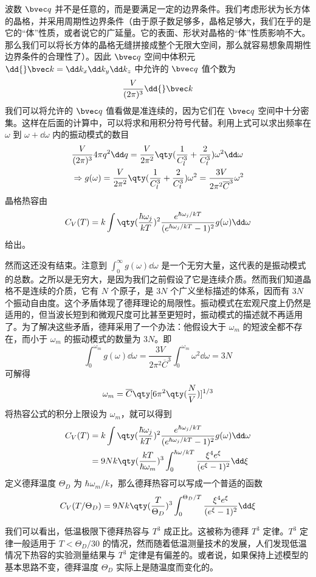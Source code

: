 波数 $\bvec q$ 并不是任意的，而是要满足一定的边界条件。我们考虑形状为长方体的晶格，并采用周期性边界条件（由于原子数足够多，晶格足够大，我们在乎的是它的“体”性质，或者说它的广延量。它的表面、形状对晶格的“体”性质影响不大。那么我们可以将长方体的晶格无缝拼接成整个无限大空间，那么就容易想象周期性边界条件的合理性了）。因此 $\bvec q$ 空间中体积元 $\dd{} \bvec k=\dd k_x\dd k_y\dd k_z$ 中允许的 $\bvec q$ 值个数为
\begin{equation}
\frac{V}{(2\pi)^3} \dd{} \bvec k
\end{equation}
我们可以将允许的 $\bvec q$ 值看做是准连续的，因为它们在 $\bvec q$ 空间中十分密集。这样在后面的计算中，可以将求和用积分符号代替。利用上式可以求出频率在 $\omega$ 到 $\omega+\dd \omega$ 内的振动模式的数目
\begin{equation}
\begin{aligned}
&\frac{V}{(2\pi)^3}4\pi q^2\dd q=\frac{V}{2\pi^2}\qty(\frac{1}{C_l^3}+\frac{2}{C_t^3})\omega^2\dd \omega\\
&\Rightarrow g(\omega)= \frac{V}{2\pi^2}\qty(\frac{1}{C_l^3}+\frac{2}{C_t^3}) \omega^2=\frac{3V}{2\pi^2 \overline C ^3} \omega^2
\end{aligned}
\end{equation}
晶格热容由
\begin{equation}
C_V(T)=k \int \qty(\frac{\hbar\omega_j}{kT})^2\frac{e^{\hbar \omega_j/kT}}{(e^{\hbar\omega_j/kT}-1)^2} g(\omega)\dd \omega
\end{equation}
给出。

然而这还没有结束。注意到 $\int_0^\infty g(\omega)\dd \omega$ 是一个无穷大量，这代表的是振动模式的总数。之所以是无穷大，是因为我们之前假设了它是连续介质。然而我们知道晶格不是连续的介质，它有 $N$ 个原子，是 $3N$ 个广义坐标描述的体系，因而有 $3N$ 个振动自由度。这个矛盾体现了德拜理论的局限性。振动模式在宏观尺度上仍然是适用的，但当波长短到和微观尺度可比甚至更短时，振动模式的描述就不再适用了。为了解决这些矛盾，德拜采用了一个办法：他假设大于 $\omega_m$ 的短波全都不存在，而小于 $\omega_m$ 的振动模式的数量为 $3N$。即
\begin{equation}
\int_0^{\omega_m} g(\omega)\dd \omega = \frac{3V}{2\pi^2\overline C^3}\int_0^{\omega_m}\omega^2\dd \omega =3N
\end{equation}
可解得
\begin{equation}
\omega_m = \overline C \qty[6\pi^2 \qty(\frac{N}{V})]^{1/3}
\end{equation}
将热容公式的积分上限设为 $\omega_m$，就可以得到
\begin{equation}
\begin{aligned}
C_V(T)&=k \int \qty(\frac{\hbar\omega_j}{kT})^2\frac{e^{\hbar \omega_j/kT}}{(e^{\hbar\omega_j/kT}-1)^2} g(\omega)\dd \omega\\
&=9Nk\qty(\frac{kT}{\hbar\omega_m})^3 \int_0^{\hbar\omega/kT} \frac{\xi^4 e^\xi}{(e^\xi-1)^2}\dd \xi
\end{aligned}
\end{equation}
定义德拜温度 $\Theta_D$ 为 $\hbar\omega_m/k$，那么德拜热容可以写成一个普适的函数
\begin{equation}
C_V(T/\Theta_D)=9Nk\qty(\frac{T}{\Theta_D})^3 \int_0^{\Theta_D/T}\frac{\xi^4 e^{\xi}}{(e^\xi-1)^2}\dd \xi
\end{equation}

我们可以看出，低温极限下德拜热容与 $T^3$ 成正比。这被称为德拜 $T^3$ 定律。$T^3$ 定律一般适用于 $T<\Theta_D/30$ 的情况，然而随着低温测量技术的发展，人们发现低温情况下热容的实验测量结果与 $T^3$ 定律是有偏差的。或者说，如果保持上述模型的基本思路不变，德拜温度 $\Theta_D$ 实际上是随温度而变化的。